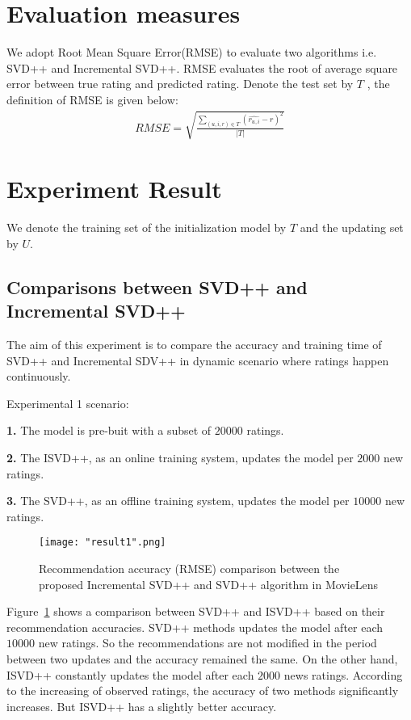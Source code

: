 \documentclass[oneside,13pt]{extreport}
\begin{document}
\section{Evaluation measures}
We adopt Root Mean Square Error(RMSE) to evaluate two algorithms i.e. SVD++ and Incremental SVD++.
RMSE evaluates the root of average square error between true rating and predicted rating. Denote the test set by $T$ , the definition of RMSE is given below:
\begin{eqnarray}
\label{eq:RMSE}
RMSE = \sqrt {\frac{{\sum\limits_{(u,i,r) \in T} {{{(\widehat {{r_{u,i}}} - r)}^2}} }}{{\left| T \right|}}} 
 \end{eqnarray}

\section{Experiment Result}
We denote the training set of the initialization model by $T$ and the updating set by $U$.  

\subsection{Comparisons between SVD++ and Incremental SVD++}
The aim of this experiment is to compare the accuracy and training time of SVD++ and Incremental SDV++ in dynamic scenario where ratings happen continuously. 

Experimental 1 scenario: 
\begin{description}
    \item{\textbf{1.}} The model is pre-buit with a subset of $20000$ ratings.
    \item{\textbf{2.}} The ISVD++, as an online training system, updates the model per $2000$ new ratings.
    \item{\textbf{3.}} The SVD++, as an offline training system, updates the model per $10000$ new ratings.
\end{description}



\begin{figure}[h!]
    \centering
    \texttt{[image: "result1".png]} 
    \caption{ Recommendation accuracy (RMSE) comparison between the proposed Incremental SVD++ and SVD++ algorithm in MovieLens}
    \label{fig:RMSE}
\end{figure}
Figure~\ref{fig:RMSE} shows a comparison between SVD++ and ISVD++ based on their recommendation accuracies. SVD++ methods updates the model after each $10000$ new ratings. So the recommendations are not modified in the period between two updates and the accuracy remained the same. On the other hand, ISVD++ constantly updates the model after each $2000$ news ratings. According to the increasing of observed ratings, the accuracy of two methods significantly increases. But ISVD++ has a slightly better accuracy.
\end{document}
